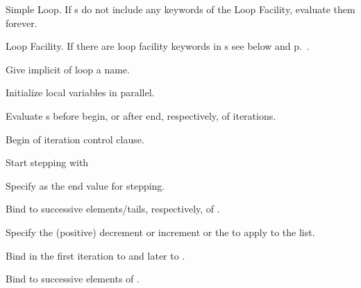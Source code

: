 \begin{LIST}{1cm}

  {
  Simple Loop. If s do
  not include any keywords of the Loop Facility, evaluate them forever. 
  }

  {
  Loop Facility. If there are loop facility keywords in s
  see below and p.\ \pageref{loop-overview}.
  }

  \begin{LIST}{.5cm}
    
    {
    Give implicit  of loop a name.
    }

    {
    Initialize local variables in parallel.
    }

    {
    Evaluate s before begin, or after end, respectively, of iterations.
    }

    {
    Begin of iteration control clause.
    }

    \begin{LIST}{.5cm}

      {
      Start stepping with 
      }

      {
      Specify  as the end value for stepping.
      }

      {
      Bind  to successive elements/tails, respectively, of .
      }

      {
      Specify the (positive) decrement or increment or the
       to apply to the list.
      }

      {
      Bind  in the first iteration to   and later to .
      }

      {
      Bind  to successive elements of .
      }


\end{LIST}
\end{LIST}
\end{LIST}
